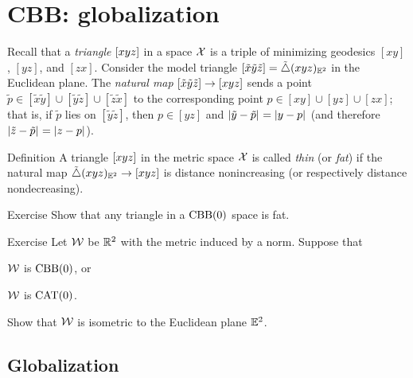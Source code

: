 \chapter{CBB: globalization}

Recall that a \emph{triangle} $[xyz]$ in a space $\mathcal{X}$ 
is a triple of minimizing geodesics $[xy]$, $[yz]$, and $[zx]$.
Consider the  model triangle $\trig{\tilde x}{\tilde y}{\tilde z}\z=\modtrig{}({x}{y}{z})_{\EE^2}$ in the Euclidean plane.
The \emph{natural map} $\trig{\tilde x}{\tilde y}{\tilde z}\z\to \trig{x}{y}{z}$ 
sends a point $\tilde p\in[\tilde x\tilde y]\cup[\tilde y\tilde z]\cup[\tilde z\tilde x]$ to the corresponding point $p\in[ x y]\cup[y z]\cup[ z x]$;
that is, if $\tilde p$ lies on $[\tilde y\tilde z]$,
then $p\in [y z]$ and $\dist{\tilde y}{\tilde p}{}=\dist{y}{p}{}$ (and therefore $\dist{\tilde z}{\tilde p}{}=\dist{z}{p}{}$).
 
\begin{thm}{Definition}\label{def:k-thin-}
A triangle $[xyz]$ in the metric space $\mathcal{X}$ 
is called \emph{thin} (or \emph{fat}) if the natural map $\tilde\triangle{}({x}{y}{z})_{\mathbb{E}^2}\to [xyz]$ is distance nonincreasing (or respectively distance nondecreasing).

\end{thm}

\begin{thm}{Exercise}\label{ex:fat}
Show that any triangle in a $\mathrm{CBB}(0)$ space is fat.
\end{thm}

\begin{thm}{Exercise}\label{ex:normCBB}
Let $\mathcal{W}$ be $\mathbb{R}^2$ with the metric induced by a norm.
Suppose that 

\begin{subthm}{}
$\mathcal{W}$ is $\mathrm{CBB}(0)$, or 
\end{subthm}

\begin{subthm}{}
$\mathcal{W}$ is $\mathrm{CAT}(0)$.
\end{subthm}

Show that $\mathcal{W}$ is isometric to the Euclidean plane $\mathbb{E}^2$.
\end{thm}

\section{Globalization}

